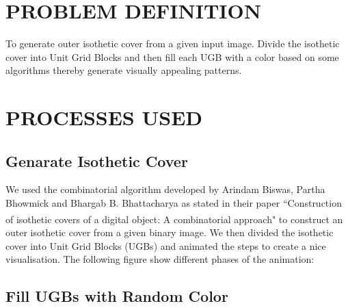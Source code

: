 \documentclass[12pt]{article}
\begin{document}
\newpage




\section{PROBLEM DEFINITION}
To generate outer isothetic cover from a given input image. Divide the isothetic cover into Unit Grid Blocks and then fill each UGB with a color based on some algorithms thereby generate visually appealing patterns.


\section{PROCESSES USED}
\subsection{Genarate Isothetic Cover}
We used the combinatorial algorithm developed by Arindam Biswas, Partha Bhowmick and Bhargab B. Bhattacharya as stated in their paper ``Construction of isothetic covers of a digital object: A combinatorial approach"\textsuperscript{\cite{lamport94}} to construct an outer isothetic cover from a given binary image. We then divided the isothetic cover into Unit Grid Blocks (UGBs) and animated the steps to create a nice visualisation. The following figure show different phases of the animation: 


\subsection{Fill UGBs with Random Color}
\end{document}
